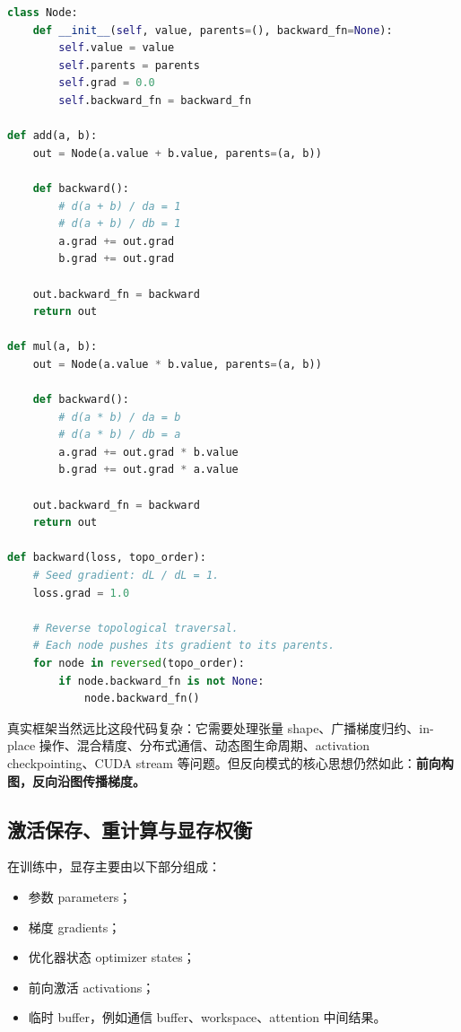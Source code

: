 \begin{lstlisting}[language=Python,caption={极简反向模式自动微分核心逻辑},label={lst:tiny-reverse-mode-autodiff}]
class Node:
    def __init__(self, value, parents=(), backward_fn=None):
        self.value = value
        self.parents = parents
        self.grad = 0.0
        self.backward_fn = backward_fn

def add(a, b):
    out = Node(a.value + b.value, parents=(a, b))

    def backward():
        # d(a + b) / da = 1
        # d(a + b) / db = 1
        a.grad += out.grad
        b.grad += out.grad

    out.backward_fn = backward
    return out

def mul(a, b):
    out = Node(a.value * b.value, parents=(a, b))

    def backward():
        # d(a * b) / da = b
        # d(a * b) / db = a
        a.grad += out.grad * b.value
        b.grad += out.grad * a.value

    out.backward_fn = backward
    return out

def backward(loss, topo_order):
    # Seed gradient: dL / dL = 1.
    loss.grad = 1.0

    # Reverse topological traversal.
    # Each node pushes its gradient to its parents.
    for node in reversed(topo_order):
        if node.backward_fn is not None:
            node.backward_fn()
\end{lstlisting}

真实框架当然远比这段代码复杂：它需要处理张量 shape、广播梯度归约、in-place 操作、混合精度、分布式通信、动态图生命周期、activation checkpointing、CUDA stream 等问题。但反向模式的核心思想仍然如此：\textbf{前向构图，反向沿图传播梯度。}

\subsection{激活保存、重计算与显存权衡}
\label{subsec:activation-recompute-memory}

在训练中，显存主要由以下部分组成：

\begin{itemize}
  \item 参数 parameters；
  \item 梯度 gradients；
  \item 优化器状态 optimizer states；
  \item 前向激活 activations；
  \item 临时 buffer，例如通信 buffer、workspace、attention 中间结果。
\end{itemize}

